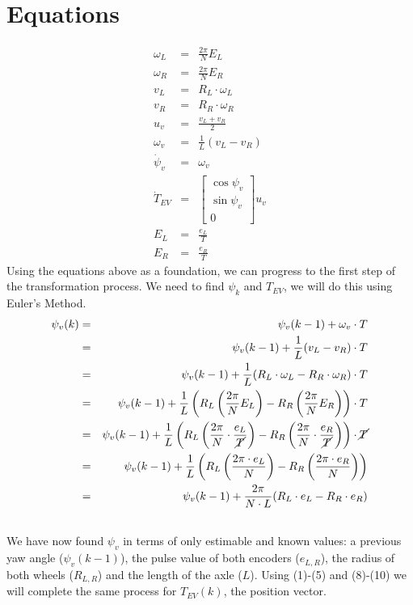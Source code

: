 \documentclass[12pt]{article}
\begin{document}
	\section{Equations}
		\begin{eqnarray}
		\omega_L &=& \frac{2\pi}{N} E_L\\
		\omega_R &=& \frac{2\pi}{N} E_R\\
		v_L &=& R_L\cdot\omega_L\\
		v_R &=& R_R\cdot\omega_R\\
		u_v &=& \frac{v_L + v_R}{2}\\
		\omega_v &=& \frac{1}{L}(v_L - v_R)\\
		\dot{\psi}_v &=& \omega_v\\
		\dot{T}_{EV} &=& 
		\left[
		\begin{array}{c}
		\cos \psi_v\\
		\sin \psi_v \\
		0
		\end{array}
		\right] u_v\\
		E_L &=& \frac{e_L}{T}\\
		E_R &=& \frac{e_R}{T}
	\end{eqnarray}
	Using the equations above as a foundation, we can progress to the first step of the transformation process. We need to find $\psi_k$ and ${T}_{EV}$, we will do this using Euler's Method.
	\begin{eqnarray}
	\psi_v(k) &=& \psi_v(k-1) + \omega_v\cdot T \nonumber\\
	&=& \psi_v(k-1) + \frac{1}{L}(v_L - v_R)\cdot T \nonumber\\
	&=& \psi_v(k-1) + \frac{1}{L}(R_L\cdot\omega_L - R_R\cdot\omega_R)\cdot T \nonumber\\
	&=& \psi_v(k-1) + \frac{1}{L}\left(R_L\left(\frac{2\pi}{N} E_L\right) - R_R\left(\frac{2\pi}{N} E_R\right)\right)\cdot T \nonumber\\
	&=& \psi_v(k-1) + \frac{1}{L}\left(R_L\left(\frac{2\pi}{N} \cdot \frac{e_L}{\cancel{T}}\right) - R_R\left(\frac{2\pi}{N} \cdot  \frac{e_R}{\cancel{T}}\right)\right)\cdot \cancel{T} \nonumber\\
	&=& \psi_v(k-1) + \frac{1}{L}\left(R_L\left(\frac{2\pi \cdot e_L}{N}\right) - R_R \left(\frac{2\pi \cdot e_R}{N}\right)\right) \nonumber \\
	&=& \psi_v(k-1) + \frac{2\pi}{N \cdot L}(R_L \cdot e_L - R_R \cdot e_R)\\
	\nonumber \end{eqnarray}
	We have now found $\psi_v$ in terms of only estimable and known values: a previous yaw angle ($\psi_v(k-1)$), the pulse value of both encoders ($e_{L,R}$), the radius of both wheels ($R_{L,R}$) and the length of the axle ($L$). Using (1)-(5) and (8)-(10) we will complete the same process for ${T}_{EV}(k)$, the position vector.\\
\end{document}
